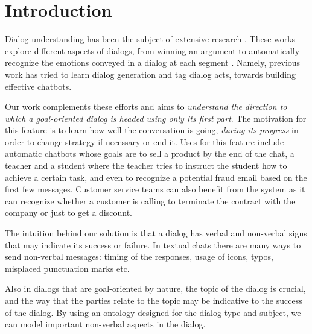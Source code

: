 \section{Introduction}\label{sec:into}
Dialog understanding has been the subject of 
extensive research \cite{BohusR03,BordesW16,GhazvininejadBC17,ShawarA03,DBLP:conf/icassp/JiB05,DBLP:conf/coling/WermterL96}. 
These works explore different aspects of dialogs, from winning an argument \cite{TanNDL16} 
to automatically recognize the emotions conveyed in a dialog at each segment \cite{AyadiKK11}. 
Namely, previous work \cite{ShawarA03,Jia09,ShawarA08,AngLS05,SurendranL06} has tried to learn dialog 
generation and tag dialog acts, towards building effective chatbots. 

Our work complements these efforts and aims to {\em understand the 
direction to which a goal-oriented dialog is headed using only its 
first part}. The motivation for this feature is to learn how 
well the conversation is going, {\em during its progress} in order 
to change strategy if necessary or end it. 
Uses for this feature include automatic chatbots whose goals 
are to sell a product by the end of the chat, a teacher and a student 
where the teacher tries to instruct the student how to achieve a certain task, 
and even to recognize a potential fraud email based on the first few 
messages.
Customer service teams can also benefit from the system as it can recognize 
whether a customer is calling to terminate the contract with the company 
or just to get a discount. 

The intuition behind our solution is that a dialog has verbal and 
non-verbal signs that may indicate its success or failure. 
In textual chats there are many ways to send non-verbal messages: 
timing of the responses, usage of icons, typos, misplaced punctuation marks etc.

Also in dialogs that are goal-oriented by nature, 
the topic of the dialog is crucial, and the way that 
the parties relate to the topic may be indicative to the success of the dialog. 
By using an ontology designed for the dialog type and subject, 
we can model important non-verbal aspects in the dialog.



